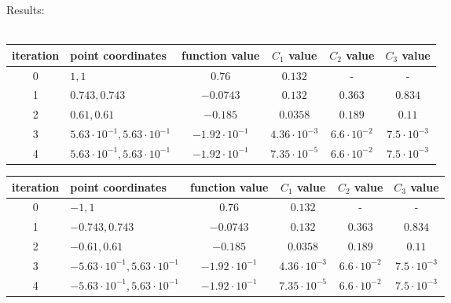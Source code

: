 \documentclass[12pt]{article}
\begin{document}
	\begin{table}[H]
		Results: \\ \\
		\begin{tabularx}{\textwidth}{c|X|c|c|c|c|}
			iteration & point coordinates & function value & $C_1$ value & $C_2$ value & $C_3$ value\\
			\hline
			0 & $1, 1$ & $0.76$ & $0.132$ & - & - \\
			\hline					
			1 & $0.743, 0.743$ & $-0.0743$ & $0.132$ & $0.363$ & $0.834$ \\ 
			\hline 
			2 & $0.61, 0.61$ & $-0.185$ & $0.0358$ & $0.189$ & $0.11$ \\ 
			\hline
			3 & $5.63\cdot10^{-1}, 5.63\cdot10^{-1}$  & $-1.92\cdot10^{-1}$ & $4.36\cdot10^{-3}$ & $6.6\cdot10^{-2}$ & $7.5\cdot10^{-3}$ \\ 
			\hline
			4 & $5.63\cdot10^{-1}, 5.63\cdot10^{-1}$  & $-1.92\cdot10^{-1}$ &
			$7.35\cdot10^{-5}$ & $6.6\cdot10^{-2}$ & $7.5\cdot10^{-3}$ \\ \hline
		\end{tabularx}	
	\end{table}		
	\begin{table}[H]
		\begin{tabularx}{\textwidth}{c|X|c|c|c|c|}
			iteration & point coordinates & function value & $C_1$ value & $C_2$ value & $C_3$ value\\
			\hline	
			0 & $-1, 1$ & $0.76$ & $0.132$ & - & - \\
			\hline					
			1 & $-0.743, 0.743$ & $-0.0743$ & $0.132$ & $0.363$ & $0.834$ \\ 
			\hline 
			2 & $-0.61, 0.61$ & $-0.185$ & $0.0358$ & $0.189$ & $0.11$ \\ 
			\hline
			3 & $-5.63\cdot10^{-1}, 5.63\cdot10^{-1}$  & $-1.92\cdot10^{-1}$ & $4.36\cdot10^{-3}$ & $6.6\cdot10^{-2}$ & $7.5\cdot10^{-3}$ \\ 
			\hline
			4 & $-5.63\cdot10^{-1}, 5.63\cdot10^{-1}$  & $-1.92\cdot10^{-1}$ &
			$7.35\cdot10^{-5}$ & $6.6\cdot10^{-2}$ & $7.5\cdot10^{-3}$ \\ \hline
		\end{tabularx}		 
	\end{table}
\end{document}
